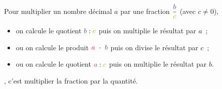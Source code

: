 \begin{aconnaitre}
Pour multiplier un nombre décimal \textcolor{B2}{$a$} par une fraction $\dfrac{\textcolor{PartieGeometrie}{b}}{\textcolor{H1}{c}}$ (avec $c \neq 0$),
\begin{itemize}
 \item on calcule le quotient $\textcolor{PartieGeometrie}{b} : \textcolor{H1}{c}$ puis on multiplie le résultat par \textcolor{B2}{$a$} ;
 \item ou on calcule le produit $\textcolor{B2}{a} \cdot \textcolor{PartieGeometrie}{b}$ puis on divise le résultat par \textcolor{H1}{$c$} ;
 \item ou on calcule le quotient $\textcolor{B2}{a} : \textcolor{H1}{c}$ puis on multiplie le résultat par \textcolor{PartieGeometrie}{$b$}.
 \end{itemize}
\end{aconnaitre}

\begin{aconnaitre}
, c'est multiplier la fraction par la quantité.
\end{aconnaitre}


